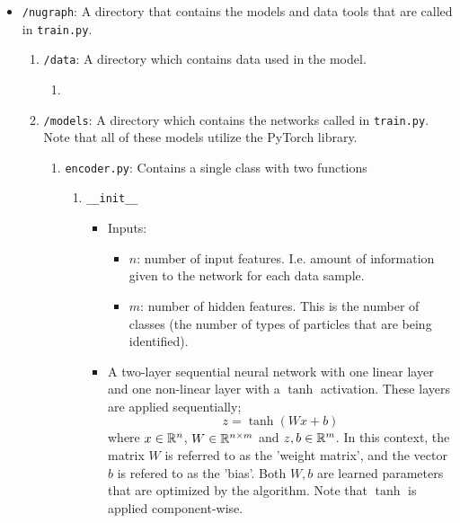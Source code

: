 \begin{itemize}
    \item \texttt{/nugraph}: A directory that contains the models and data tools that are called in \texttt{train.py}.
        \begin{enumerate}
            \item \texttt{/data}: A directory which contains data used in the model.
                \begin{enumerate}
                    \item 
                \end{enumerate}
            \item \texttt{/models}: A directory which contains the networks called in \texttt{train.py}. Note that all of these models utilize the PyTorch library.
                \begin{enumerate}
                    \item \texttt{encoder.py}: Contains a single class with two functions
                        \begin{enumerate}
                            \item \texttt{\_\_init\_\_}
                            \begin{itemize}
                                \item Inputs:
                                    \begin{itemize}
                                        \item $n$: number of input features. I.e. amount of information given to the network for each data sample.

                                        \item $m$: number of hidden features. This is the number of classes (the number of types of particles that are being identified).
                                    \end{itemize}

                                \item A  two-layer sequential neural network with one linear layer and one non-linear layer with a $\tanh$ activation. These layers are applied sequentially;
                                    \begin{equation}
                                        z = \tanh\left(Wx + b\right)
                                    \end{equation}
                                where $x\in \mathbb{R}^n$, $W\in \mathbb{R}^{n\times m}$ and $z, b\in \mathbb{R}^m$. In this context, the matrix $W$ is referred to as the 'weight matrix', and the vector $b$ is refered to as the 'bias'. Both $W, b$ are learned parameters that are optimized by the algorithm. Note that $\tanh$ is applied component-wise.



\end{itemize}
\end{enumerate}
\end{enumerate}
\end{enumerate}
\end{itemize}
